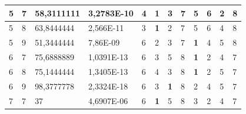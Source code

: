 \documentclass[conference]{IEEEtran}
\begin{document}
\begin{table}[]
\begin{tabular}{|llll|llllllll|}
		\multicolumn{1}{|l|}{5}   & \multicolumn{1}{l|}{7}         & \multicolumn{1}{l|}{58,3111111}    & 3,2783E-10 & \multicolumn{1}{l|}{4}   & \multicolumn{1}{l|}{\textbf{1}} & \multicolumn{1}{l|}{3}          & \multicolumn{1}{l|}{7}   & \multicolumn{1}{l|}{5}          & \multicolumn{1}{l|}{6}          & \multicolumn{1}{l|}{2}          & 8                      \\ \hline
		\multicolumn{1}{|l|}{5}   & \multicolumn{1}{l|}{8}         & \multicolumn{1}{l|}{63,8444444}    & 2,566E-11  & \multicolumn{1}{l|}{3}   & \multicolumn{1}{l|}{\textbf{1}} & \multicolumn{1}{l|}{2}          & \multicolumn{1}{l|}{7}   & \multicolumn{1}{l|}{5}          & \multicolumn{1}{l|}{6}          & \multicolumn{1}{l|}{4}          & 8                      \\ \hline
		\multicolumn{1}{|l|}{5}   & \multicolumn{1}{l|}{9}         & \multicolumn{1}{l|}{51,3444444}    & 7,86E-09   & \multicolumn{1}{l|}{6}   & \multicolumn{1}{l|}{2}          & \multicolumn{1}{l|}{3}          & \multicolumn{1}{l|}{7}   & \multicolumn{1}{l|}{\textbf{1}} & \multicolumn{1}{l|}{4}          & \multicolumn{1}{l|}{5}          & 8                      \\ \hline
		\multicolumn{1}{|l|}{6}   & \multicolumn{1}{l|}{7}         & \multicolumn{1}{l|}{75,6888889}    & 1,0391E-13 & \multicolumn{1}{l|}{6}   & \multicolumn{1}{l|}{3}          & \multicolumn{1}{l|}{5}          & \multicolumn{1}{l|}{8}   & \multicolumn{1}{l|}{\textbf{1}} & \multicolumn{1}{l|}{2}          & \multicolumn{1}{l|}{4}          & 7                      \\ \hline
		\multicolumn{1}{|l|}{6}   & \multicolumn{1}{l|}{8}         & \multicolumn{1}{l|}{75,1444444}    & 1,3405E-13 & \multicolumn{1}{l|}{6}   & \multicolumn{1}{l|}{4}          & \multicolumn{1}{l|}{3}          & \multicolumn{1}{l|}{8}   & \multicolumn{1}{l|}{\textbf{1}} & \multicolumn{1}{l|}{2}          & \multicolumn{1}{l|}{5}          & 7                      \\ \hline
		\multicolumn{1}{|l|}{6}   & \multicolumn{1}{l|}{9}         & \multicolumn{1}{l|}{98,3777778}    & 2,3324E-18 & \multicolumn{1}{l|}{6}   & \multicolumn{1}{l|}{3}          & \multicolumn{1}{l|}{\textbf{1}} & \multicolumn{1}{l|}{8}   & \multicolumn{1}{l|}{2}          & \multicolumn{1}{l|}{4}          & \multicolumn{1}{l|}{5}          & 7                      \\ \hline
		\multicolumn{1}{|l|}{7}   & \multicolumn{1}{l|}{7}         & \multicolumn{1}{l|}{37}            & 4,6907E-06 & \multicolumn{1}{l|}{6}   & \multicolumn{1}{l|}{\textbf{1}} & \multicolumn{1}{l|}{5}          & \multicolumn{1}{l|}{8}   & \multicolumn{1}{l|}{3}          & \multicolumn{1}{l|}{2}          & \multicolumn{1}{l|}{4}          & 7                      \\ \hline

\end{tabular}
\end{table}
\end{document}
